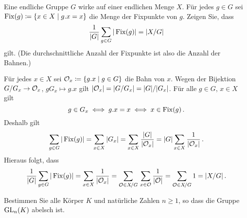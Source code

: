 \begin{question}[subtitle = Bahnen zählen]
  Eine endliche Gruppe $G$ wirke auf einer endlichen Menge $X$.
  Für jedes $g \in G$ sei $\operatorname{Fix}(g) \coloneqq \{x \in X \mid g.x = x\}$ die Menge der Fixpunkte von $g$.
  Zeigen Sie, dass
  \[
      \frac{1}{|G|} \sum_{g \in G} |\operatorname{Fix}(g)|
    = |X/G|
  \]
  gilt.
  (Die durchschnittliche Anzahl der Fixpunkte ist also die Anzahl der Bahnen.)
\end{question}


\begin{solution}
  Für jedes $x \in X$ sei $\mathcal{O}_x \coloneqq \{g.x \mid g \in G\}$ die Bahn von $x$.
  Wegen der Bijektion $G/G_x \to \mathcal{O}_x$, $g G_x \mapsto g.x$ gilt $|\mathcal{O}_x| = |G/G_x| = |G|/|G_x|$.
  Für alle $g \in G$, $x \in X$ gilt
  \[
          g \in G_x
    \iff  g.x = x
    \iff  x \in \operatorname{Fix}(g) \,.
  \]
  Deshalb gilt
  \[
      \sum_{g \in G} |\operatorname{Fix}(g)|
    = \sum_{x \in X} |G_x|
    = \sum_{x \in X} \frac{|G|}{|\mathcal{O}_x|}
    = |G| \sum_{x \in X} \frac{1}{|\mathcal{O}_x|} \,.
  \]
  Hieraus folgt, dass
  \[
      \frac{1}{|G|} \sum_{g \in G} |\operatorname{Fix}(g)|
    = \sum_{x \in X} \frac{1}{|\mathcal{O}_x|}
    = \sum_{\mathcal{O} \in X\!/G} \, \sum_{x \in \mathcal{O}} \frac{1}{|\mathcal{O}|}
    = \sum_{\mathcal{O} \in X\!/G} 1
    = |X/G| \,.
  \]

\end{solution}


\begin{question}[subtitle = {Zur Kommutativität von $\GL_n(K)$}]
  Bestimmen Sie alle Körper $K$ und natürliche Zahlen $n \geq 1$, so dass die Gruppe $\GL_n(K)$ abelsch ist.
\end{question}

